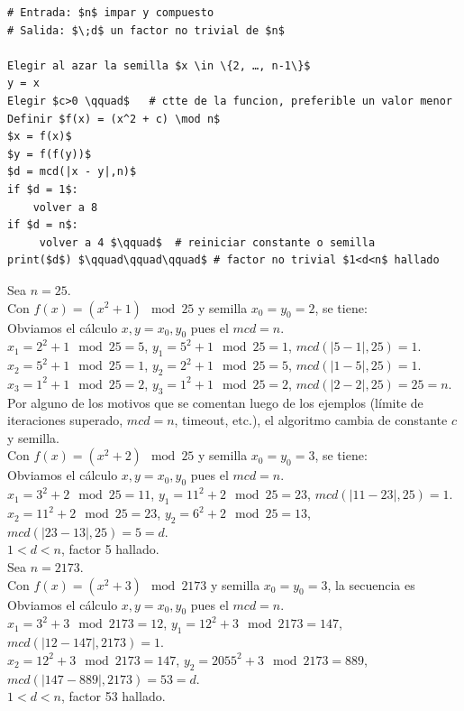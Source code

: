 \begin{lstlisting}[caption={Algoritmo Rho de Pollard}, label={alg:AlgPollard}, mathescape=true]
# Entrada: $n$ impar y compuesto
# Salida: $\;d$ un factor no trivial de $n$

Elegir al azar la semilla $x \in \{2, …, n-1\}$  
y = x
Elegir $c>0 \qquad$   # ctte de la funcion, preferible un valor menor
Definir $f(x) = (x^2 + c) \mod n$
$x = f(x)$
$y = f(f(y))$
$d = mcd(|x - y|,n)$
if $d = 1$:
    volver a 8
if $d = n$:
     volver a 4 $\qquad$  # reiniciar constante o semilla
print($d$) $\qquad\qquad\qquad$ # factor no trivial $1<d<n$ hallado
\end{lstlisting}

\begin{ejemplo}
Sea $n=25$. \\
Con $f(x) = (x^2 + 1) \mod 25$ y semilla $x_0=y_0=2$, se tiene: \\
Obviamos el cálculo $x,y=x_0,y_0$ pues el $mcd=n$. \\
$x_1=2^2+1 \mod 25 =5$, $y_1=5^2+1 \mod 25 =1$, $mcd(|5 - 1|,25)=1$. \\
$x_2=5^2+1 \mod 25 =1$, $y_2=2^2+1 \mod 25 =5$, $mcd(|1 - 5|,25) = 1$. \\
$x_3=1^2+1 \mod 25 =2$, $y_3=1^2+1 \mod 25 =2$, $mcd(|2 - 2|,25) = 25 = n$. \\
Por alguno de los motivos que se comentan luego de los ejemplos (límite de iteraciones superado, $mcd=n$, timeout, etc.), el algoritmo cambia de constante $c$ y semilla. \\
Con $f(x) = (x^2 + 2) \mod 25$ y semilla $x_0=y_0=3$, se tiene: \\
Obviamos el cálculo $x,y=x_0,y_0$ pues el $mcd=n$. \\
$x_1=3^2+2 \mod 25 =11$, $y_1=11^2+2 \mod 25 =23$, $mcd(|11 - 23|,25)=1$. \\
$x_2=11^2+2 \mod 25 =23$, $y_2=6^2+2 \mod 25 =13$, $mcd(|23 - 13|,25)=5=d$. \\
$1<d<n$, factor 5 hallado. \\
Sea $n=2173$. \\
Con $f(x) = (x^2 + 3) \mod 2173$ y semilla $x_0=y_0=3$, la secuencia es \\
Obviamos el cálculo $x,y=x_0,y_0$ pues el $mcd=n$. \\
$x_1=3^2+3 \mod 2173 =12$, $y_1=12^2+3 \mod 2173 =147$, $mcd(|12 - 147|,2173)=1$. \\
$x_2=12^2+3 \mod 2173 =147$, $y_2=2055^2+3 \mod 2173 =889$, $mcd(|147 - 889|,2173)=53=d$. \\
$1<d<n$, factor 53 hallado. 
\end{ejemplo}

